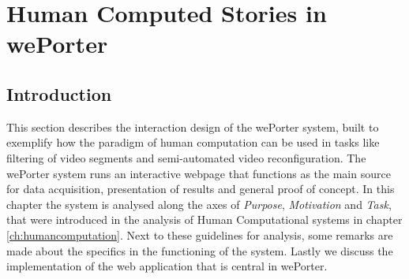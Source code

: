 \chapter{Human Computed Stories in wePorter}
\label{chap:weporter}



% 
% 
% 
% 

\section{Introduction}


This section describes the interaction design of the wePorter system, built to exemplify how the paradigm of human computation can be used in tasks like filtering of video segments and semi-automated video reconfiguration. The wePorter system runs an interactive webpage that functions as the main source for data acquisition, presentation of results and general proof of concept. In this chapter the system is analysed along the axes of \textit{Purpose}, \textit{Motivation} and \textit{Task}, that were introduced in the analysis of Human Computational systems in chapter \ref{ch:humancomputation}. Next to these guidelines for analysis, some remarks are made about the specifics in the functioning of the system. Lastly we discuss the implementation of the web application that is central in wePorter.

